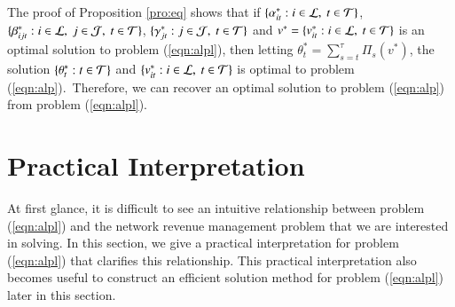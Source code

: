 The proof of Proposition \ref{pro:eq} shows that if $\{\alpha^*_{it} : i \in {\cal L},~t \in {\cal T}\}$, $\{ \beta^*_{ijt} : i \in {\cal L},~j \in {\cal J},~ t \in {\cal T}\}$, $
\{\gamma^*_{jt} : j \in {\cal J},~ t \in {\cal T}\}$ and $v^* = \{ v^*_{it}: i \in {\cal L},~ t \in {\cal T}\}$ is an optimal solution to problem (\ref{eqn:alpl}), then letting $\theta^*_t = \sum_{s=t}^\tau \Pi_s(v^*)$, the solution $\{\theta^*_t : t \in {\cal T}\}$ and $\{ v^*_{it} : i \in {\cal L},~ t \in {\cal T}\}$ is optimal to problem (\ref{eqn:alp}).~Therefore, we can recover an optimal solution to problem (\ref{eqn:alp}) from problem (\ref{eqn:alpl}).

\section{Practical Interpretation}
\label{sec:interp}

At first glance, it is difficult to see an intuitive relationship between problem (\ref{eqn:alpl}) and the network revenue management problem that we are interested in solving. In this section, we give a practical interpretation for problem (\ref{eqn:alpl}) that clarifies this relationship. This practical interpretation also becomes useful to construct an efficient solution method for problem (\ref{eqn:alpl}) later in this section. 


